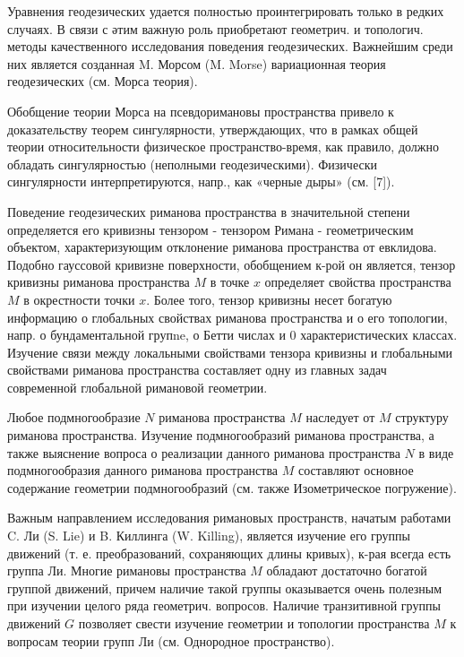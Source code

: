 \documentclass[10pt]{article}
\begin{document}
Уравнения геодезических удается полностью проинтегрировать только в редких случаях. В связи с әтим важную роль приобретают геометрич. и топологич. методы качественного исследования поведения геодезических. Важнейшим среди них является созданная M. Морсом (M. Morse) вариационная теория геодезических (см. Морса теория).



Обобщение теории Морса на псевдоримановы пространства привело к доказательству теорем сингулярности, утверждающих, что в рамках общей теории относительности физическое пространство-время, как правило, должно обладать сингулярностью (неполными геодезическими). Физически сингулярности интерпретируются, напр., как «черные дыры» (см. [7]).



Поведение геодезических риманова пространства в значительной степени определяется его кривизны тензором - тензором Римана - геометрическим объектом, характеризующим отклонение риманова пространства от евклидова. Подобно гауссовой кривизне поверхности, обобщением к-рой он является, тензор кривизны риманова пространства $M$ в точке $x$ определяет свойства пространства $M$ в окрестности точки $x$. Более того, тензор кривизны несет богатую информацию о глобальных свойствах риманова пространства и о его топологии, напр. о бундаментальной групne, о Бетти числах и 0 характеристических классах. Изучение связи между локальными свойствами тензора кривизны и глобальными свойствами риманова пространства составляет одну из главных задач современной глобальной римановой геометрии.



Любое подмногообразие $N$ риманова пространства $M$ наследует от $M$ структуру риманова пространства. Изучение подмногообразий риманова пространства, а также выяснение вопроса о реализации данного риманова пространства $N$ в виде подмногообразия данного риманова пространства $M$ составляют основное содержание геометрии подмногообразий (см. также Изометрическое погружение).



Важным направлением исследования римановых пространств, начатым работами C. Ли (S. Lie) и B. Киллинга (W. Killing), является изучение его группы движений (т. е. преобразований, сохраняющих длины кривых), к-рая всегда есть группа Ли. Многие римановы пространства $M$ обладают достаточно богатой группой движений, причем наличие такой группы оказывается очень полезным при изучении целого ряда геометрич. вопросов. Наличие транзитивной группы движений $G$ позволяет свести изучение геометрии и топологии пространства $M$ к вопросам теории групп Ли (см. Однородное пространство).
\end{document}
